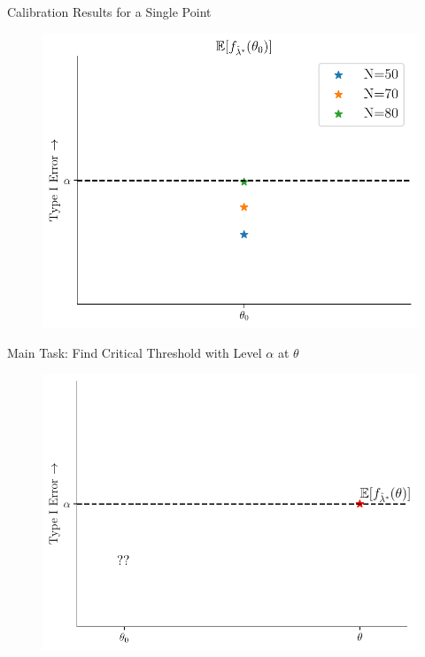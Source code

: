 \begin{frame}{Calibration Results for a Single Point}
\begin{figure}
    \centering
    \includegraphics[width=0.9\linewidth]{figs/calibration_point_null_solution.pdf}
\end{figure} 
\end{frame}

\begin{frame}{Main Task: Find Critical Threshold with Level $\alpha$ at $\theta$}
 \begin{figure}
     \centering
     \includegraphics[width=0.95\linewidth]{figs/calibration_tile.pdf}
 \end{figure}
\end{frame}

